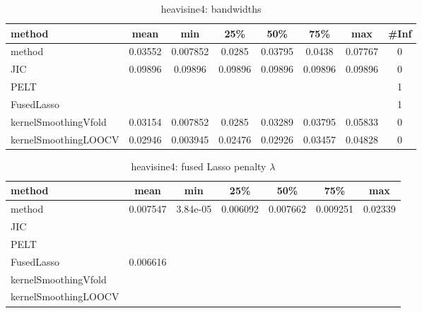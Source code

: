 \begin{table}[ht]
\centering
\begin{tabular}{l|c|ccccc|c}
  \hline
method & mean & min & 25\% & 50\% & 75\% & max & \#Inf \\ 
  \hline
method & 0.03552 & 0.007852 & 0.0285 & 0.03795 & 0.0438 & 0.07767 &   0 \\ 
  JIC & 0.09896 & 0.09896 & 0.09896 & 0.09896 & 0.09896 & 0.09896 &   0 \\ 
  PELT &  &  &  &  &  &  &   1 \\ 
  FusedLasso &  &  &  &  &  &  &   1 \\ 
  kernelSmoothingVfold & 0.03154 & 0.007852 & 0.0285 & 0.03289 & 0.03795 & 0.05833 &   0 \\ 
  kernelSmoothingLOOCV & 0.02946 & 0.003945 & 0.02476 & 0.02926 & 0.03457 & 0.04828 &   0 \\ 
   \hline
\end{tabular}
\caption{heavisine4: bandwidths} 
\label{tab:heavisine4Bandwidths}
\end{table}
\begin{table}[ht]
\centering
\begin{tabular}{l|c|ccccc}
  \hline
method & mean & min & 25\% & 50\% & 75\% & max \\ 
  \hline
method & 0.007547 & 3.84e-05 & 0.006092 & 0.007662 & 0.009251 & 0.02339 \\ 
  JIC &  &  &  &  &  &  \\ 
  PELT &  &  &  &  &  &  \\ 
  FusedLasso & 0.006616 &  &  &  &  &  \\ 
  kernelSmoothingVfold &  &  &  &  &  &  \\ 
  kernelSmoothingLOOCV &  &  &  &  &  &  \\ 
   \hline
\end{tabular}
\caption{heavisine4: fused Lasso penalty $\lambda$} 
\label{tab:heavisine4Lambdas}
\end{table}
